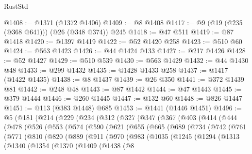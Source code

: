 \begin{lexlean}{RustStd}
\begin{coremodule}
@1408 := @1371 (@1372 @1406)
@1409 := @8 @1408
@1417 := @9 (@19 (@235 (@368 @641))) (@26 (@348 @374)) @245
@1418 := @47 @511
@1419 := @87 @1418
@1420 := @1397 @1419
@1422 := @52 @1420 @258
@1423 := @510 @60
@1424 := @563 @1423
@1426 := @44 @1424 @133
@1427 := @217 @1426
@1428 := @52 @1427
@1429 := @510 @539
@1430 := @563 @1429
@1432 := @44 @1430 @48
@1433 := @299 @1432
@1435 := @1428 @1433 @258
@1437 := @1417 (@1422 @1435)
@1438 := @8 @1437
@1439 := @26 @350
@1441 := @372 @1439 @81
@1442 := @248 @48
@1443 := @87 @1442
@1444 := @47 @1443
@1445 := @379 @1444
@1446 := @260 @1445
@1447 := @132 @60
@1448 := @826 @1447
@1451 := @113 (@383 @1448) @685
@1453 := @1441 (@1446 @1451)
@1496 := @5
    (@181
      (@214
        (@229
          (@234
            (@312
              (@327
                (@347
                  (@367
                    (@403
                      (@414
                        (@444
                          (@478
                            (@526
                              (@553
                                (@574
                                  (@590
                                    (@621
                                      (@655
                                        (@665
                                          (@689
                                            (@734
                                              (@742
                                                (@761
                                                  (@771
                                                    (@810
                                                      (@820
                                                        (@889
                                                          (@911
                                                            (@970
                                                              (@983
                                                                (@1035
                                                                  (@1245
                                                                    (@1294
                                                                      (@1313
                                                                        (@1340
                                                                          (@1354
                                                                            (@1370
                                                                              (@1409
                                                                                (@1438
                                                                                  (@8

\end{coremodule}
\end{lexlean}
